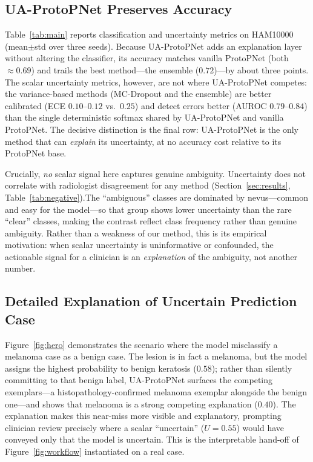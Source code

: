 \documentclass[10pt]{article}
\newcommand{\method}{UA-ProtoPNet}
\begin{document}
\subsection{\method{} Preserves Accuracy}

Table~\ref{tab:main} reports classification and uncertainty metrics on HAM10000
(mean$\pm$std over three seeds). Because \method{} adds an explanation layer
without altering the classifier, its accuracy matches vanilla ProtoPNet (both
$\approx 0.69$) and trails the best method---the ensemble ($0.72$)---by about
three points. The scalar uncertainty metrics, however, are not where \method{}
competes: the variance-based methods (MC-Dropout and the ensemble) are better
calibrated (ECE $0.10$--$0.12$ vs.\ $0.25$) and detect errors better
(AUROC $0.79$--$0.84$) than the single deterministic softmax shared by \method{}
and vanilla ProtoPNet. The decisive distinction is the final row: \method{} is
the only method that can \emph{explain} its uncertainty, at no accuracy cost
relative to its ProtoPNet base.

Crucially, \emph{no} scalar signal here captures genuine ambiguity. Uncertainty
does not correlate with radiologist disagreement for any method
(Section~\ref{sec:results}, Table~\ref{tab:negative}).The ``ambiguous'' classes
are dominated by nevus---common and easy for the model---so that group shows
lower uncertainty than the rare ``clear'' classes, making the contrast reflect
class frequency rather than genuine ambiguity. Rather than a weakness of our method, this is its empirical
motivation: when scalar uncertainty is uninformative or confounded, the
actionable signal for a clinician is an \emph{explanation} of the ambiguity, not
another number.

\subsection{Detailed Explanation of Uncertain Prediction Case}

Figure~\ref{fig:hero} demonstrates the scenario where the model misclassify a melanoma case as a benign case. 
The lesion is in fact a melanoma, but the model assigns the highest probability
to benign keratosis ($0.58$); rather than silently committing to that benign
label, \method{} surfaces the competing exemplars---a histopathology-confirmed
melanoma exemplar alongside the benign one---and shows that melanoma is a strong
competing explanation ($0.40$). The explanation makes this near-miss more visible and explanatory,
prompting clinician review precisely where a scalar ``uncertain'' ($U=0.55$)
would have conveyed only that the model is uncertain. This is the interpretable
hand-off of Figure~\ref{fig:workflow} instantiated on a real case.
\end{document}
